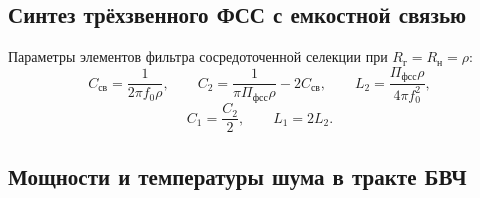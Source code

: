 \documentclass[12pt,a4paper]{article}
\begin{document}
\subsection{Синтез трёхзвенного ФСС с емкостной связью}
Параметры элементов фильтра сосредоточенной селекции при $R_{\text{г}} = R_{\text{н}} = \rho$:
\begin{equation}
C_{\text{св}} = \frac{1}{2\pi f_0 \rho}, \qquad C_2 = \frac{1}{\pi \Pi_{\text{фсс}} \rho} - 2 C_{\text{св}}, \qquad L_2 = \frac{\Pi_{\text{фсс}} \rho}{4\pi f_0^2},
\end{equation}
\begin{equation}
C_1 = \frac{C_2}{2}, \qquad L_1 = 2 L_2.
\end{equation}

\subsection{Мощности и температуры шума в тракте БВЧ}
\end{document}
